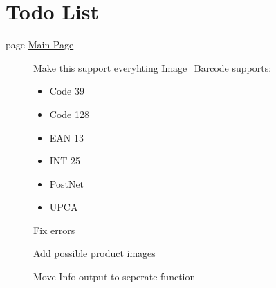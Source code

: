 \hypertarget{todo}{}\section{Todo List}\label{todo}
\label{todo__todo000001}
\hypertarget{todo__todo000001}{}
 \begin{description}
\item[page \hyperlink{index}{Main Page} ]Make this support everyhting Image\_\-Barcode supports:\begin{itemize}
\item Code 39\item Code 128\item EAN 13\item INT 25\item PostNet\item UPCA \end{itemize}


Fix errors 

Add possible product images 

Move Info output to seperate function

\end{description}
